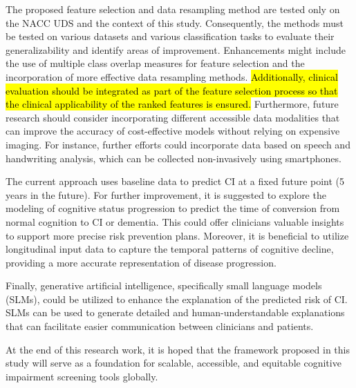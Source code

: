 The proposed feature selection and data resampling method are tested only on the NACC UDS and the context of this study. Consequently, the methods must be tested on various datasets and various classification tasks to evaluate their generalizability and identify areas of improvement. Enhancements might include the use of multiple class overlap measures for feature selection and the incorporation of more effective data resampling methods. \hl{Additionally, clinical evaluation should be integrated as part of the feature selection process so that the clinical applicability of the ranked features is ensured.} Furthermore, future research should consider incorporating different accessible data modalities that can improve the accuracy of cost-effective models without relying on expensive imaging. For instance, further efforts could incorporate data based on speech and handwriting analysis, which can be collected non-invasively using smartphones.

The current approach uses baseline data to predict CI at a fixed future point (5 years in the future). For further improvement, it is suggested to explore the modeling of cognitive status progression to predict the time of conversion from normal cognition to CI or dementia. This could offer clinicians valuable insights to support more precise risk prevention plans. Moreover, it is beneficial to utilize longitudinal input data to capture the temporal patterns of cognitive decline, providing a more accurate representation of disease progression.

Finally, generative artificial intelligence, specifically small language models (SLMs), could be utilized to enhance the explanation of the predicted risk of CI. SLMs can be used to generate detailed and human-understandable explanations that can facilitate easier communication between clinicians and patients.

At the end of this research work, it is hoped that the framework proposed in this study will serve as a foundation for scalable, accessible, and equitable cognitive impairment screening tools globally.